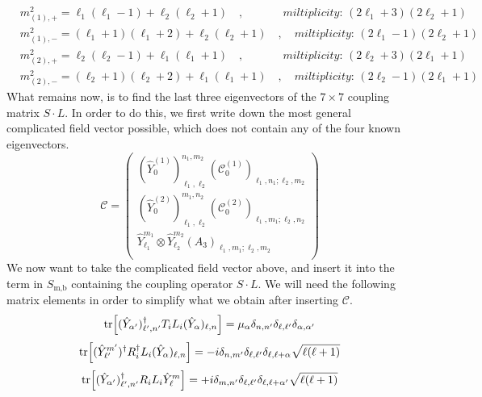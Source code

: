 %
%
\begin{align}
& m^2_{(1),+} = \ell_1 (\ell_1 - 1) + \ell_2 (\ell_2 + 1)
%
\quad , \quad\quad\quad\;\,
%
\textit{miltiplicity: } (2 \ell_1 + 3) (2 \ell_2 + 1)
\\
& m^2_{(1),-} = (\ell_1 + 1) (\ell_1 + 2) + \ell_2 (\ell_2 + 1)
%
\quad , \quad
%
\textit{miltiplicity: } (2 \ell_1 - 1) (2 \ell_2 + 1)
\\
& m^2_{(2),+} = \ell_2 (\ell_2 - 1) + \ell_1 (\ell_1 + 1)
%
\quad , \quad\quad\quad\;\,
%
\textit{miltiplicity: } (2 \ell_2 + 3) (2 \ell_1 + 1)
\\
& m^2_{(2),-} = (\ell_2 + 1) (\ell_2 + 2) + \ell_1 (\ell_1 + 1)
%
\quad , \quad
%
\textit{miltiplicity: } (2 \ell_2 - 1) (2 \ell_1 + 1)
\end{align}
%
%
What remains now, is to find the last three eigenvectors of the $7 \times 7$ coupling matrix $S \cdot L$.	In order to do this, we first write down the most general complicated field vector possible, which does not contain any of the four known eigenvectors.
%
%
\begin{equation}\label{complicated fields modified fuzzy sphericals}
\mathcal{C}
=
\left( \begin{array}{c}
(\hat{Y}^{(1)}_{0})^{n_1,m_2}_{\ell_1,\ell_2}
(\mathcal{C}^{(1)}_{0})_{\ell_1,n_1;\ell_2,m_2} \\
(\hat{Y}^{(2)}_{0})^{m_1,n_2}_{\ell_1,\ell_2}
(\mathcal{C}^{(2)}_{0})_{\ell_1,m_1;\ell_2,n_2} \\
\hat{Y}^{m_1}_{\ell_1} \otimes \hat{Y}^{m_2}_{\ell_2}
(A_3)_{\ell_1,m_1;\ell_2,m_2} \\
\end{array} \right)
\end{equation}
%
%
We now want to take the complicated field vector above, and insert it into the term in $S_{\text{m,b}}$ containing the coupling operator $S \cdot L$. We will need the following matrix elements in order to simplify what we obtain after inserting $\mathcal{C}$.
%
%
\begin{equation}
\tr[ (\hat{Y}_{\alpha'})_{\ell',n'}^\dagger
T_i L_i (\hat{Y}_\alpha)_{\ell,n} ]
=
\mu_\alpha \delta_{n,n'} \delta_{\ell,\ell'} \delta_{\alpha,\alpha'}
\end{equation}
%
%
\begin{equation}
\tr[ (\hat{Y}^{m'}_{\ell'})^\dagger
R_i^\dagger L_i  (\hat{Y}_\alpha)_{\ell,n} ]
=
-i \delta_{n,m'} \delta_{\ell,\ell'} \delta_{\ell,\ell + \alpha}
\sqrt{\ell (\ell+1)}
\end{equation}
%
%
\begin{equation}
\tr[ (\hat{Y}_{\alpha'})_{\ell',n'}^\dagger
R_i L_i \hat{Y}^{m}_{\ell} ]
=
+i \delta_{m,n'} \delta_{\ell,\ell'} \delta_{\ell,\ell + \alpha'}
\sqrt{\ell (\ell+1)}
\end{equation}
